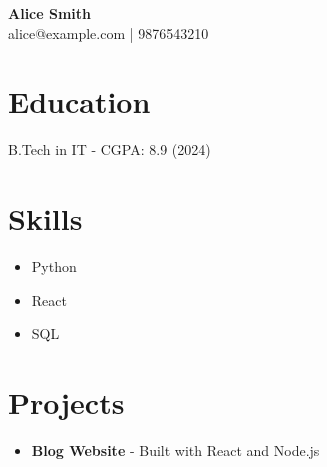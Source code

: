 \documentclass{article}
\begin{document}
\begin{center}
    {\LARGE \textbf{ Alice Smith }} \\
    alice@example.com | 9876543210
\end{center}

\section*{Education}
B.Tech in IT - CGPA: 8.9 (2024)


\section*{Skills}
\begin{itemize}
  
    \item Python
  
    \item React
  
    \item SQL
  
\end{itemize}



\section*{Projects}
\begin{itemize}
  
    \item \textbf{ Blog Website } - Built with React and Node.js
  
\end{itemize}
\end{document}
